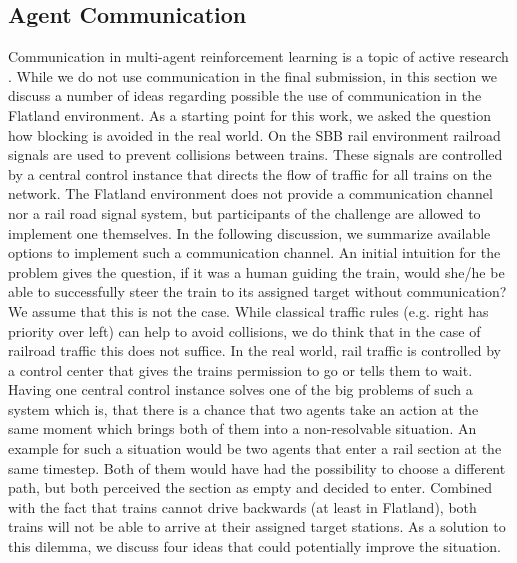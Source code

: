 \subsection*{Agent Communication}\label{agent_communication}
Communication in multi-agent reinforcement learning is a topic of active research \cite{marlsurvey}. While we do not use communication in the final submission, in this section we discuss a number of ideas regarding possible the use of communication in the Flatland environment. As a starting point for this work, we asked the question how blocking is avoided in the real world. On the SBB rail environment railroad signals are used to prevent collisions between trains. These signals are controlled by a central control instance that directs the flow of traffic for all trains on the network.
The Flatland environment does not provide a communication channel nor a rail road signal system, but participants of the challenge are allowed to implement one themselves. In the following discussion, we summarize available options to implement such a communication channel. An initial intuition for the problem gives the question, if it was a human guiding the train, would she/he be able to successfully steer the train to its assigned target without communication?
We assume that this is not the case. While classical traffic rules (e.g. right has priority over left) can help to avoid collisions, we do think that in the case of railroad traffic this does not suffice. In the real world, rail traffic is controlled by a control center that gives the trains permission to go or tells them to wait. Having one central control instance solves one of the big problems of such a system which is, that there is a chance that two agents take an action at the same moment which brings both of them into a non-resolvable situation. An example for such a situation would be two agents that enter a rail section at the same timestep. Both of them would have had the possibility to choose a different path, but both perceived the section as empty and decided to enter. Combined with the fact that trains cannot drive backwards (at least in Flatland), both trains will not be able to arrive at their assigned target stations. As a solution to this dilemma, we discuss four ideas that could potentially improve the situation.
